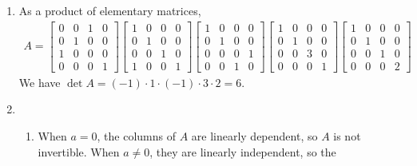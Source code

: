\documentclass[red]{tutorial}
\makeatletter
\DeclarePairedDelimiter\norm{\lVert}{\rVert}
\DeclarePairedDelimiter\abs{\lvert}{\rvert}
\let\oldnorm\norm
\def\norm{\@ifstar{\oldnorm}{\oldnorm*}}
\let\oldabs\abs
\def\abs{\@ifstar{\oldabs}{\oldabs*}}
\theoremstyle{definition}
\theoremstyle{theorem}
\makeatother
\begin{document}
{\begin{solutions}
\begin{enumerate}
\begin{enumerate}
\begin{align*}
            = \abs{\lambda}\cdot\norm*{T(x)}
            = \lambda \norm*{T(x)}
          \end{align*}
          which establishes almost linearity.
      \end{enumerate}
    \item
      As a product of elementary matrices,
      \begin{align*}
        A =
        \begin{bmatrix}
          0 & 0 & 1 & 0 \\
          0 & 1 & 0 & 0 \\
          1 & 0 & 0 & 0 \\
          0 & 0 & 0 & 1
        \end{bmatrix}
        \begin{bmatrix}
          1 & 0 & 0 & 0 \\
          0 & 1 & 0 & 0 \\
          0 & 0 & 1 & 0 \\
          1 & 0 & 0 & 1
        \end{bmatrix}
        \begin{bmatrix}
          1 & 0 & 0 & 0 \\
          0 & 1 & 0 & 0 \\
          0 & 0 & 0 & 1 \\
          0 & 0 & 1 & 0
        \end{bmatrix}
        \begin{bmatrix}
          1 & 0 & 0 & 0 \\
          0 & 1 & 0 & 0 \\
          0 & 0 & 3 & 0 \\
          0 & 0 & 0 & 1
        \end{bmatrix}
        \begin{bmatrix}
          1 & 0 & 0 & 0 \\
          0 & 1 & 0 & 0 \\
          0 & 0 & 1 & 0 \\
          0 & 0 & 0 & 2
        \end{bmatrix}
      \end{align*}
      We have $\det A=(-1)\cdot1\cdot(-1)\cdot3\cdot2=6$.
    \item
      \begin{enumerate}
        \item
          When $a=0$, the columns of $A$ are linearly dependent, so $A$ is not
          invertible. When $a\neq 0$, they are linearly independent, so the

\end{enumerate}
\end{enumerate}
\end{solutions}}
\end{document}
